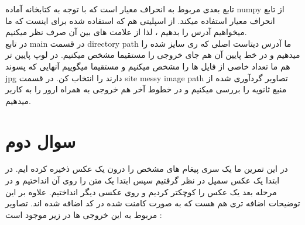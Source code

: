 \documentclass{report}
\begin{document}
تابع بعدی مربوط به انحراف معیار است که با توجه به کتابخانه آماده numpy از تابع انحراف معیار استفاده میکند. از اسپلیتی هم که استفاده شده برای اینست که ما میخواهیم آدرس را بدهیم ، لذا از علامت های بین آن صرف نظر میکنیم. \\
در تابع main در قسمت directory path ما آدرس دیتاست اصلی که ری سایز شده را میدهیم و در خط پایین آن هم جای خروجی را مستقیما مشخص میکنیم. در لوپ پایین تر هم ما تعداد خاصی از فایل ها را مشخص میکنیم و مستقیما میگوییم آنهایی که پسوند jpg دارند را 
انتخاب کن. در قسمت site messy image path تصاویر گردآوری شده از منبع ثانویه را بررسی میکنیم و در خطوط آخر هم خروجی به همراه ارور را به کاربر میدهیم. 

\chapter{ سوال دوم }
در این تمرین ما یک سری پیغام های مشخص را درون یک عکس ذخیره کرده ایم. در ابتدا یک عکس سمپل در نظر گرفتیم سپس ابتدا یک متن را روی آن انداختیم و در مرحله بعد  یک عکس را کوچکتر کردیم و روی عکسی دیگر انداختیم. علاوه بر این توضیحات اضافه تری هم هست که به صورت کامنت شده در کد اضافه شده اند. 
تصاویر مربوط  به این خروجی ها در زیر موجود است : \\
   
    
\end{document}
